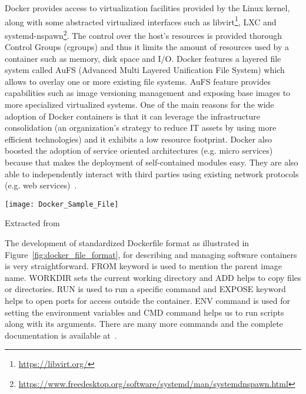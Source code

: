 Docker provides access to virtualization facilities provided by the 
Linux kernel, along with some abstracted virtualized interfaces such as 
libvirt\footnote{\url{https://libvirt.org/}}, LXC and 
systemd-nspawn\footnote{\url{https://www.freedesktop.org/software/systemd/man/systemdnspawn.html}}. 
The control over the host's resources is provided thorough Control 
Groups (cgroups) and thus it limits the amount of resources used by a 
container such as memory, disk space and I/O. Docker features a layered 
file system called AuFS (Advanced Multi Layered Unification File 
System) which allows to overlay one or more existing file systems. AuFS 
feature provides capabilities such as image versioning management and 
exposing base images to more specialized virtualized systems. One of 
the main reasons for the wide adoption of Docker containers is that it 
can leverage the infrastructure consolidation (an organization's 
strategy to reduce IT assets by using more efficient technologies) and 
it exhibits a low resource footprint. Docker also boosted the adoption 
of service oriented architectures (e.g. micro services) because that 
makes the deployment of self-contained modules easy. They are also able 
to independently interact with third parties using existing network 
protocols (e.g. web services)~\cite{Xavier:2013:PEC:2497369.2497577}. 


\begin{center}
\texttt{[image: Docker\_Sample\_File]}
\label{fig:docker_file_format}
\caption*{Extracted from \cite{docker-file-format}}
\end{center}

The development of standardized Dockerfile format as illustrated in 
Figure~\ref{fig:docker_file_format}, for describing and managing 
software containers is very straightforward. FROM keyword is used to 
mention the parent image name. WORKDIR sets the current working 
directory and ADD helps to copy files or directories. RUN is used to 
run a specific command and EXPOSE keyword helps to open ports for 
access outside the container. ENV command is used for setting the 
environment variables and CMD command helps us to run scripts along 
with its arguments. There are many more commands and the complete 
documentation is available at~\cite{docker_commands}.

